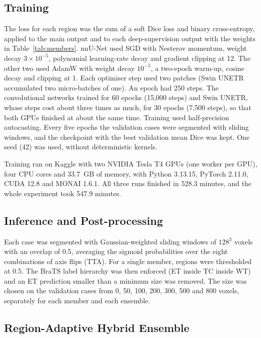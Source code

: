 \documentclass[a4paper,fleqn]{cas-sc}
\begin{document}
\subsection{Training}
\label{sec:training}

The loss for each region was the sum of a soft Dice loss and binary cross-entropy, applied to the main output and to each deep-supervision output with the weights in Table~\ref{tab:members}. nnU-Net used SGD with Nesterov momentum, weight decay $3\times 10^{-5}$, polynomial learning-rate decay and gradient clipping at 12. The other two used AdamW with weight decay $10^{-5}$, a two-epoch warm-up, cosine decay and clipping at 1. Each optimiser step used two patches (Swin UNETR accumulated two micro-batches of one). An epoch had 250 steps. The convolutional networks trained for 60 epochs (15,000 steps) and Swin UNETR, whose steps cost about three times as much, for 30 epochs (7,500 steps), so that both GPUs finished at about the same time. Training used half-precision autocasting. Every five epochs the validation cases were segmented with sliding windows, and the checkpoint with the best validation mean Dice was kept. One seed (42) was used, without deterministic kernels.

Training ran on Kaggle with two NVIDIA Tesla T4 GPUs (one worker per GPU), four CPU cores and 33.7~GB of memory, with Python 3.13.15, PyTorch 2.11.0, CUDA 12.8 and MONAI 1.6.1. All three runs finished in 528.3 minutes, and the whole experiment took 547.9 minutes.

\subsection{Inference and Post-processing}
\label{sec:inference}

Each case was segmented with Gaussian-weighted sliding windows of $128^3$ voxels with an overlap of 0.5, averaging the sigmoid probabilities over the eight combinations of axis flips (TTA). For a single member, regions were thresholded at 0.5. The BraTS label hierarchy was then enforced (ET inside TC inside WT) and an ET prediction smaller than a minimum size was removed. The size was chosen on the validation cases from 0, 50, 100, 200, 300, 500 and 800 voxels, separately for each member and each ensemble.

\subsection{Region-Adaptive Hybrid Ensemble}
\label{sec:fusion}
\end{document}
